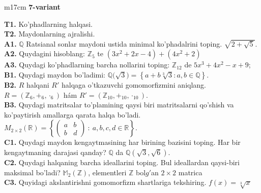 \documentclass{article}
\begin{document}
\begin{tabular}{m{17cm}}
\textbf{7-variant}
\newline

\textbf{T1.} Ko'phadlarning halqasi. \\
\textbf{T2.} Maydonlarning ajralishi. \\
\textbf{A1.} \(\mathbb{Q}\) Ratsianal sonlar maydoni ustida minimal ko'phadalrini toping.
\(\sqrt{2 + \sqrt{5}}\). \\
\textbf{A2.} Quydagini hisoblang:
\(\mathbb{Z}_{5}\) te \(\left( 3x^{2} + 2x - 4 \right) + \left( 4x^{2} + 2 \right)\) \\
\textbf{A3.} Quydagi ko'phadlarning barcha nollarini toping:
\(\mathbb{Z}_{12}\) de \(5x^{3} + 4x^{2} - x + 9\); \\
\textbf{B1.} Quydagi maydon bo'ladimi:
\(\mathbb{Q(}\sqrt{3}) = \left\{ a + b\sqrt[3]{3}:a,b \in \mathbb{Q} \right\}\). \\
\textbf{B2.} \(R\) halqani \(R'\) halqaga o'tkazuvchi gomomorfizmini aniqlang.
\(R = (\mathbb{Z}_{6}, +_{6}, \cdot_{6})\) hám \(R' = (\mathbb{Z}_{10}, +_{10}, \cdot_{10})\). \\
\textbf{B3.} Quydagi matritsalar to'plamining qaysi biri matritsalarni qo'shish va ko'paytirish amallarga qarata halqa bo'ladi.
\(M_{2 \times 2}\mathbb{(R) =}\left\{ \begin{pmatrix}
a & b \\
b & d
\end{pmatrix}\ :\ a,b,c,d \in \mathbb{R} \right\}\). \\
\textbf{C1.} Quydagi maydon kengaytmasining har birining bazisini toping. Har bir kengaytmaning darajasi qanday?
\(\mathbb{Q}\) da \(\mathbb{Q}\left( \sqrt{3},\sqrt{6} \right)\). \\
\textbf{C2.} Quydagi halqaning barcha ideallarini toping. Bul ideallardan qaysi-biri maksimal bo'ladi?
\(\mathbb{M}_{2}\left( \mathbb{Z} \right)\), elementleri \(\mathbb{Z}\) bol\(g'\)an \(2 \times 2\) matrica \\
\textbf{C3.} Quyidagi akslantirishni gomomorfizm shartlariga tekshiring. \(f(x) = \sqrt[3]{x}\) \\

\end{tabular}
\vspace{1cm}
\end{document}
